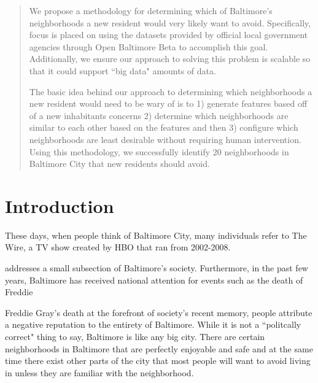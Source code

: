 \documentclass[conference]{IEEEtran}
\begin{document}
\begin{abstract}
We propose a methodology for determining which of Baltimore's neighborhoods a new resident would very likely want to avoid.
Specifically, focus is placed on using the datasets provided by official local government agencies through Open Baltimore
Beta to accomplish this goal.  Additionally, we ensure our approach to solving this problem is scalable so that it could support ``big data"
amounts of data.

The basic idea behind our approach to determining which neighborhoods a new resident would need to be wary of is to 1)
generate features based off of a new inhabitants concerns 2) determine which neighborhoods are similar to each other based
on the features and then 3) configure which neighborhoods are least desirable without requiring human intervention.  Using
this methodology, we successfully identify 20 neighborhoods in Baltimore City that new residents should avoid.

\end{abstract}





%
\IEEEpeerreviewmaketitle



\section{Introduction}
These days, when people think of Baltimore City, many individuals refer to The Wire, a TV show created by HBO that ran from 2002-2008.

addresses a small subsection of Baltimore's society.
Furthermore, in the past few years, Baltimore has received national attention for events such as the death of Freddie

Freddie Gray's death at the forefront of society's recent memory, people attribute a negative reputation to the entirety of Baltimore.  While it is not a ``politcally correct" thing to say, Baltimore is like any big city.  There are certain neighborhoods in Baltimore that are perfectly enjoyable and safe 
and at the same time there exist other parts of the city that most people will want to avoid living in unless they are familiar with the neighborhood.  
\end{document}
